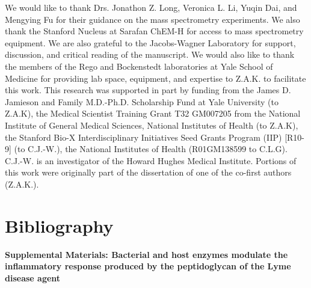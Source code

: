 \documentclass[twoside, watermark]{zHenriquesLab-StyleBioRxiv}
\begin{document}
\begin{acknowledgements}
We would like to thank Drs. Jonathon Z. Long, Veronica L. Li, Yuqin Dai, and Mengying Fu for their guidance on the mass spectrometry experiments. We also thank the Stanford Nucleus at Sarafan ChEM-H for access to mass spectrometry equipment. We are also grateful to the Jacobs-Wagner Laboratory for support, discussion, and critical reading of the manuscript. We would also like to thank the members of the Rego and Bockenstedt laboratories at Yale School of Medicine for providing lab space, equipment, and expertise to Z.A.K. to facilitate this work. This research was supported in part by funding from the James D. Jamieson and Family M.D.-Ph.D. Scholarship Fund at Yale University (to Z.A.K), the Medical Scientist Training Grant T32 GM007205 from the National Institute of General Medical Sciences, National Institutes of Health (to Z.A.K), the Stanford Bio-X Interdisciplinary Initiatives Seed Grants Program (IIP) [R10-9] (to C.J.-W.), the National Institutes of Health (R01GM138599 to C.L.G). C.J.-W. is an investigator of the Howard Hughes Medical Institute. Portions of this work were originally part of the dissertation of one of the co-first authors (Z.A.K.).
\end{acknowledgements}

\section*{Bibliography}

\onecolumn
\pagebreak
\begin{center}
\textbf{\large Supplemental Materials: Bacterial and host enzymes modulate the inflammatory response produced by the peptidoglycan of the Lyme disease agent}
\end{center}
\setcounter{equation}{0}
\setcounter{figure}{0}
\setcounter{table}{0}
\setcounter{page}{1}
\makeatletter
\renewcommand{\theequation}{S\arabic{equation}}
\renewcommand{\thefigure}{S\arabic{figure}}
\renewcommand{\thetable}{S\arabic{table}}


\end{document}
